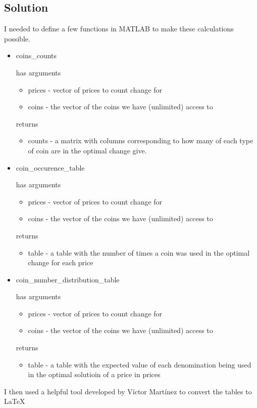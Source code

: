 \documentclass{article}
\begin{document}
\subsection{Solution}
I needed to define a few functions in MATLAB to make these calculations possible.
\begin{itemize}
    \item coins\_counts

          has arguments
          \begin{itemize}
              \item prices - vector of prices to count change for
              \item coins - the vector of the coins we have (unlimited) access to
          \end{itemize}

          returns
          \begin{itemize}
              \item counts - a matrix with columns corresponding to how many of each type of coin are in the optimal change give.
          \end{itemize}
    \item coin\_occurence\_table

          has arguments
          \begin{itemize}
              \item prices - vector of prices to count change for
              \item coins - the vector of the coins we have (unlimited) access to
          \end{itemize}

          returns
          \begin{itemize}
              \item table - a table with the number of times a coin was used in the optimal change for each price
          \end{itemize}
    \item coin\_number\_distribution\_table

          has arguments
          \begin{itemize}
              \item prices - vector of prices to count change for
              \item coins - the vector of the coins we have (unlimited) access to
          \end{itemize}

          returns
          \begin{itemize}
              \item table - a table with the expected value of each denomination being used in the optimal solutioin of a price in prices
          \end{itemize}
\end{itemize}
I then used a helpful tool developed by Víctor Martínez to convert the tables to \LaTeX
\end{document}
